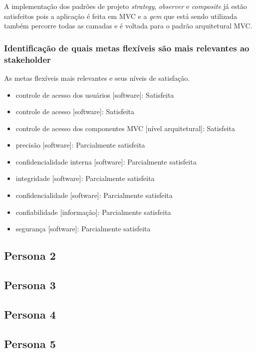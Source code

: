 A implementação dos padrões de projeto \textit{strategy}, \textit{observer} e \textit{composite} já estão satisfeitos pois a aplicação é feita em MVC e a \textit{gem} que está sendo utilizada também percorre todas as camadas e é voltada para o padrão arquitetural MVC. 

\subsubsection{Identificação de quais metas flexíveis são mais relevantes ao stakeholder}

As metas flexíveis mais relevantes e seus níveis de satisfação.


\begin{itemize}
	\item controle de acesso dos usuários [software]: Satisfeita
	\item controle de acesso [software]: Satisfeita
	\item controle de acesso dos componentes MVC [nível arquitetural]: Satisfeita
	\item precisão [software]: Parcialmente satisfeita
	\item confidencialidade interna [software]: Parcialmente satisfeita
	\item integridade [software]: Parcialmente satisfeita
	\item confidencialidade [software]: Parcialmente satisfeita
	\item confiabilidade [informação]: Parcialmente satisfeita
	\item segurança [software]: Parcialmente satisfeita
\end{itemize}

\subsection{Persona 2}
\label{subsec:persona2}

\subsection{Persona 3}
\label{subsec:persona3}

\subsection{Persona 4}
\label{subsec:persona4}

\subsection{Persona 5}
\label{subsec:persona5}

